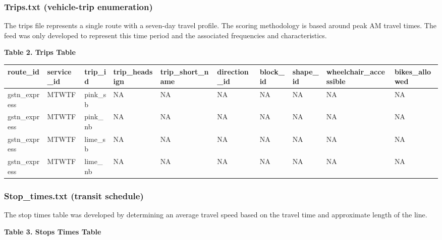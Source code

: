 \documentclass[
]{article}
\begin{document}
\subsubsection{Trips.txt (vehicle-trip
enumeration)}\label{trips.txt-vehicle-trip-enumeration}

The trips file represents a single route with a seven-day travel
profile. The scoring methodology is based around peak AM travel times.
The feed was only developed to represent this time period and the
associated frequencies and characteristics.

\textbf{Table 2. Trips Table}

\begin{table}
\centering
\begin{tabular}[t]{l|l|l|l|l|l|l|l|l|l}
\hline
route\_id & service\_id & trip\_id & trip\_headsign & trip\_short\_name & direction\_id & block\_id & shape\_id & wheelchair\_accessible & bikes\_allowed\\
\hline
gstn\_express & MTWTF & pink\_sb & NA & NA & NA & NA & NA & NA & NA\\
\hline
gstn\_express & MTWTF & pink\_nb & NA & NA & NA & NA & NA & NA & NA\\
\hline
gstn\_express & MTWTF & lime\_sb & NA & NA & NA & NA & NA & NA & NA\\
\hline
gstn\_express & MTWTF & lime\_nb & NA & NA & NA & NA & NA & NA & NA\\
\hline
\end{tabular}
\end{table}

\subsubsection{Stop\_times.txt (transit
schedule)}\label{stop_times.txt-transit-schedule}

The stop times table was developed by determining an average travel
speed based on the travel time and approximate length of the line.

\textbf{Table 3. Stops Times Table}
\end{document}
